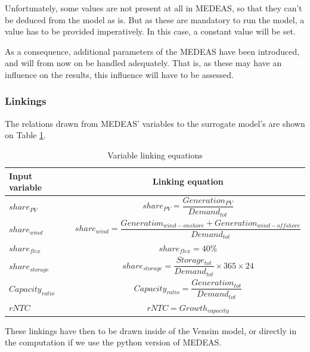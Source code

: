 Unfortunately, some values are not present at all in MEDEAS, so that they can't be deduced from the model as is. But as these are mandatory to run the model, a value has to be provided imperatively. In this case, a constant value will be set.

As a consequence, additional parameters of the MEDEAS have been introduced, and will from now on be handled adequately. That is, as these may have an influence on the results, this influence will have to be assessed.

\subsubsection{Linkings}

The relations drawn from MEDEAS' variables to the surrogate model's are shown on Table \ref{tab:linking-equations}.

\begin{table}[htb]
    \centering
    \begin{tabular}{|m{3.6cm}|c|}
    \hline 
    Input variable & Linking equation \\ \hline
    $share_{PV}$ & $share_{PV}=\dfrac{Generation_{PV}}{Demand_{tot}}$ \\ \hline 
    $share_{wind}$ & $share_{wind}=\dfrac{Generation_{wind-onshore} + Generation_{wind-offshore}}{Demand_{tot}}$ \\ \hline 
    $share_{flex}$ & $share_{flex}=40\%$ \\ \hline 
    $share_{storage}$ & $share_{storage}=\dfrac{Storage_{tot}}{Demand_{tot}}\times 365\times 24$ \\ \hline 
    $Capacity_{ratio}$ & $Capacity_{ratio}=\dfrac{Generation_{tot}}{Demand_{tot}}$ \\ \hline 
    $rNTC$ & $rNTC= Growth_{capacity}$ \\ \hline 
    \end{tabular}
    \caption{Variable linking equations}
    \label{tab:linking-equations}
\end{table}

These linkings have then to be drawn inside of the Vensim model, or directly in the computation if we use the python version of MEDEAS.